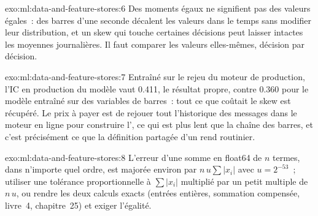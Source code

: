 \begin{solution}{exo:ml:data-and-feature-stores:6}
Des moments égaux ne signifient pas des valeurs égales~: des barres d'une seconde décalent les valeurs dans le temps sans modifier leur distribution, et un skew
qui touche certaines décisions peut laisser intactes les moyennes journalières. Il faut comparer les valeurs elles-mêmes, décision par décision.
\end{solution}

\begin{solution}{exo:ml:data-and-feature-stores:7}
Entraîné sur le rejeu du moteur de production, l'IC en production du modèle vaut 0.411, le résultat propre, contre 0.360 pour le modèle entraîné sur
des variables de barres~: tout ce que coûtait le skew est récupéré. Le prix à payer est de rejouer tout l'historique des messages dans le moteur en ligne
pour construire l', ce qui est plus lent que la chaîne des barres, et c'est précisément ce que la définition partagée d'un  rend routinier.
\end{solution}

\begin{solution}{exo:ml:data-and-feature-stores:8}
L'erreur d'une somme en float64 de $n$ termes, dans n'importe quel ordre, est majorée environ par $n\,u\sum|x_i|$ avec $u = 2^{-53}$~; utiliser une tolérance
proportionnelle à $\sum|x_i|$ multiplié par un petit multiple de $n\,u$, ou rendre les deux calculs exacts (entrées entières, sommation
compensée, livre~4, chapitre~25) et exiger l'égalité.
\end{solution}

